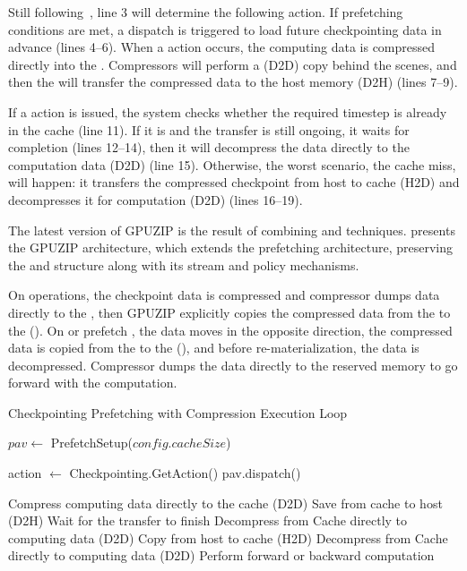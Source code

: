 \documentclass[Ingles,Final]{ic-tese-v3}
\begin{document}
Still following~, line 3 will determine the following \checkpointing action. If prefetching conditions are met, a dispatch is triggered to load future checkpointing data in advance (lines 4–6). When a \save action occurs, the computing data is compressed directly into the \cache. Compressors will perform a \dtd (D2D) copy behind the scenes, and then the \cache will transfer the compressed data to the host memory (D2H) (lines 7–9). 

If a \restore action is issued, the system checks whether the required timestep is already in the cache (line 11). If it is and the transfer is still ongoing, it waits for completion (lines 12–14), then it will decompress the data directly to the computation data (D2D) (line 15). Otherwise, the worst scenario, the cache miss, will happen: it transfers the compressed checkpoint from host to cache (H2D) and decompresses it for computation (D2D) (lines 16–19).

The latest version of GPUZIP is the result of combining \compression and \prefetching techniques.  presents the GPUZIP architecture, which extends the prefetching architecture, preserving the \cache and \pool structure along with its stream and policy mechanisms.

On \save operations, the checkpoint data is compressed and compressor dumps data directly to the \cache {}, then GPUZIP explicitly copies the compressed data from the \cache to the \pool (\dth). On \restore {} or prefetch , the data moves in the opposite direction, the compressed data is copied from the \pool to the \cache (\htd), and before re-materialization, the data is decompressed. Compressor dumps the data directly to the \awave reserved memory to go forward with the computation.

\begin{algorithm}
\caption{Checkpointing Prefetching with Compression Execution Loop}
\label{alg:gpuzip_loop}
\begin{algorithmic}[1]
\STATE $pav \gets$ PrefetchSetup($config.cacheSize$)

    \STATE action $\gets$ Checkpointing.GetAction()
        \STATE pav.dispatch()
    \ENDIF
    
        \STATE Compress computing data directly to the cache (D2D)
        \STATE Save from cache to host (D2H)
                \STATE Wait for the transfer to finish
            \ENDIF
            \STATE Decompress from Cache directly to computing data (D2D) 
        \ELSE
            \STATE Copy from host to cache (H2D)
            \STATE Decompress from Cache directly to computing data (D2D)
        \ENDIF
        \STATE Perform forward or backward computation
    \ENDIF
\ENDWHILE
\end{algorithmic}
\end{algorithm}
\end{document}

